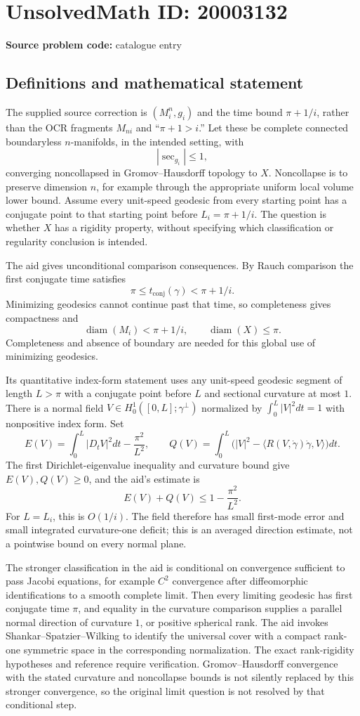 \documentclass[11pt]{article}
\begin{document}
\section*{UnsolvedMath ID: 20003132}
\textbf{Source problem code:} catalogue entry
\subsection{Definitions and mathematical statement}
The supplied source correction is $(M_i^n,g_i)$ and the time bound $\pi+1/i$, rather than the OCR fragments $M_{ni}$ and ``$\pi+1>i$.'' Let these be complete connected boundaryless $n$-manifolds, in the intended setting, with
\[
 |\sec_{g_i}|\leq1,
\]
converging noncollapsed in Gromov--Hausdorff topology to $X$. Noncollapse is to preserve dimension $n$, for example through the appropriate uniform local volume lower bound. Assume every unit-speed geodesic from every starting point has a conjugate point to that starting point before $L_i=\pi+1/i$. The question is whether $X$ has a rigidity property, without specifying which classification or regularity conclusion is intended.

The aid gives unconditional comparison consequences. By Rauch comparison the first conjugate time satisfies
\[
 \pi\leq t_{\mathrm{conj}}(\gamma)<\pi+1/i.
\]
Minimizing geodesics cannot continue past that time, so completeness gives compactness and
\[
 \operatorname{diam}(M_i)<\pi+1/i,\qquad
 \operatorname{diam}(X)\leq\pi.
\]
Completeness and absence of boundary are needed for this global use of minimizing geodesics.

Its quantitative index-form statement uses any unit-speed geodesic segment of length $L>\pi$ with a conjugate point before $L$ and sectional curvature at most $1$. There is a normal field $V\in H_0^1([0,L];\gamma^\perp)$ normalized by $\int_0^L|V|^2dt=1$ with nonpositive index form. Set
\[
 E(V)=\int_0^L|D_tV|^2dt-\frac{\pi^2}{L^2},\qquad
 Q(V)=\int_0^L\bigl(|V|^2-
       \langle R(V,\dot\gamma)\dot\gamma,V\rangle\bigr)dt.
\]
The first Dirichlet-eigenvalue inequality and curvature bound give $E(V),Q(V)\geq0$, and the aid's estimate is
\[
 E(V)+Q(V)\leq1-\frac{\pi^2}{L^2}.
\]
For $L=L_i$, this is $O(1/i)$. The field therefore has small first-mode error and small integrated curvature-one deficit; this is an averaged direction estimate, not a pointwise bound on every normal plane.

The stronger classification in the aid is conditional on convergence sufficient to pass Jacobi equations, for example $C^2$ convergence after diffeomorphic identifications to a smooth complete limit. Then every limiting geodesic has first conjugate time $\pi$, and equality in the curvature comparison supplies a parallel normal direction of curvature $1$, or positive spherical rank. The aid invokes Shankar--Spatzier--Wilking to identify the universal cover with a compact rank-one symmetric space in the corresponding normalization. The exact rank-rigidity hypotheses and reference require verification. Gromov--Hausdorff convergence with the stated curvature and noncollapse bounds is not silently replaced by this stronger convergence, so the original limit question is not resolved by that conditional step.
\end{document}
